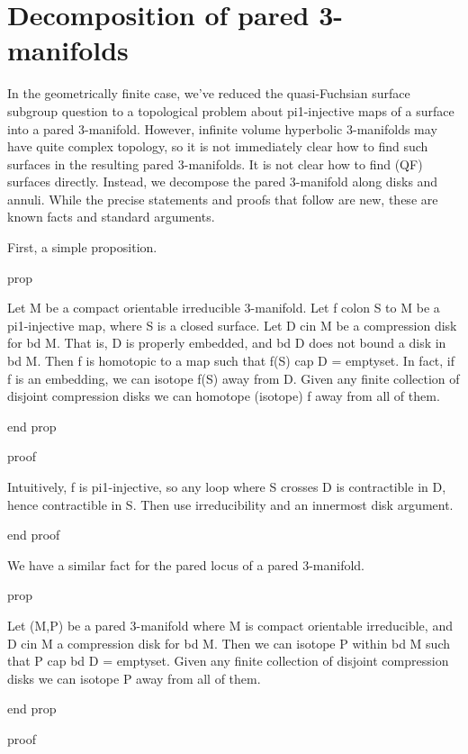 \section{Decomposition of pared 3-manifolds}

In the geometrically finite case, we've reduced the quasi-Fuchsian surface
subgroup question to a topological problem about pi1-injective maps of
a surface into a pared 3-manifold. However, infinite volume hyperbolic
3-manifolds may have quite complex topology, so it is not immediately clear how
to find such surfaces in the resulting pared 3-manifolds. It is not clear how
to find (QF) surfaces directly. Instead, we decompose the pared 3-manifold
along disks and annuli. While the precise statements and proofs that follow are
new, these are known facts and standard arguments.




First, a simple proposition.

prop

Let M be a compact orientable irreducible 3-manifold. Let f colon S to M be
a pi1-injective map, where S is a closed surface.  Let D cin M be a compression
disk for bd M.  That is, D is properly embedded, and bd D does not bound a disk
in bd M.  Then f is homotopic to a map such that f(S) cap D = emptyset.  In
fact, if f is an embedding, we can isotope f(S) away from D.  Given any finite
collection of disjoint compression disks we can homotope (isotope) f away from
all of them.

end prop

proof

Intuitively, f is pi1-injective, so any loop where S crosses D is contractible
in D, hence contractible in S. Then use irreducibility and an innermost disk
argument.



end proof

We have a similar fact for the pared locus of a pared 3-manifold.

prop

Let (M,P) be a pared 3-manifold where M is compact orientable irreducible, and
D cin M a compression disk for bd M. Then we can isotope P within bd M such
that P cap bd D = emptyset. Given any finite collection of disjoint compression
disks we can isotope P away from all of them.

end prop

proof



